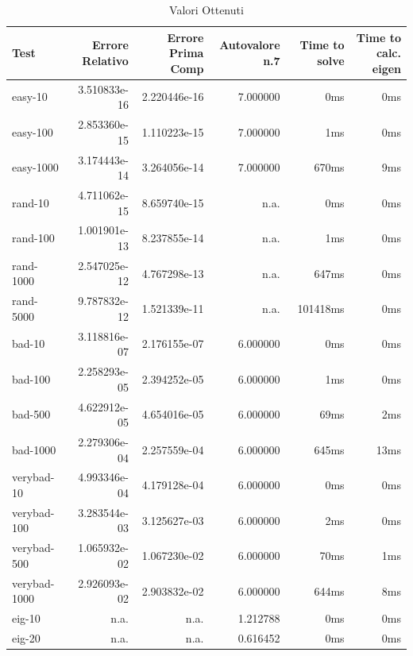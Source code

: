 \documentclass[12pt]{article}
\begin{document}
\begin{table}[h]
\caption {Valori Ottenuti} \label{tab:title}
\begin{center}
\begin{tabular}{|l|r|r|r|r|r|}
\hline
Test         &	Errore Relativo  &	Errore Prima Comp  & Autovalore n.7    &	Time to solve &	Time to calc. eigen \\
\hline
     easy-10 &	    3.510833e-16 &	      2.220446e-16 &           7.000000 & 	0ms		 	 &		0ms   \\
    easy-100 &	    2.853360e-15 &	      1.110223e-15 &           7.000000 & 	1ms		 	 &		0ms   \\
   easy-1000 &	    3.174443e-14 &	      3.264056e-14 &           7.000000 &	670ms		 &		9ms   \\
     rand-10 &	    4.711062e-15 &	      8.659740e-15 &               n.a. & 	0ms		 	 &		0ms   \\
    rand-100 &	    1.001901e-13 &	      8.237855e-14 &               n.a. & 	1ms		 	 &		0ms   \\
   rand-1000 &	    2.547025e-12 &	      4.767298e-13 &               n.a. &	647ms		 &		0ms   \\
   rand-5000 &	    9.787832e-12 &	      1.521339e-11 &               n.a. &	101418ms	 &		0ms   \\
      bad-10 &	    3.118816e-07 &	      2.176155e-07 &           6.000000 & 	0ms		 	 &		0ms   \\
     bad-100 &	    2.258293e-05 &	      2.394252e-05 &           6.000000 & 	1ms		 	 &		0ms   \\
     bad-500 &	    4.622912e-05 &	      4.654016e-05 &           6.000000 &	69ms		 &		2ms   \\
    bad-1000 &	    2.279306e-04 &	      2.257559e-04 &           6.000000 &	645ms		&		13ms   \\
  verybad-10 &	    4.993346e-04 &	      4.179128e-04 &           6.000000 & 	0ms		 	&		0ms   \\
 verybad-100 &	    3.283544e-03 &	      3.125627e-03 &           6.000000 & 	2ms		 	&		0ms   \\
 verybad-500 &	    1.065932e-02 &	      1.067230e-02 &           6.000000 &	70ms		 &		1ms   \\
verybad-1000 &	    2.926093e-02 &	      2.903832e-02 &           6.000000 &	644ms		 &		8ms   \\
      eig-10 &	            n.a. &	              n.a. &           1.212788 & 	0ms		 	&		0ms   \\
      eig-20 &	            n.a. &	              n.a. &           0.616452 & 	0ms		 &			0ms   \\

\end{tabular}
\end{center}
\end{table}
\end{document}
